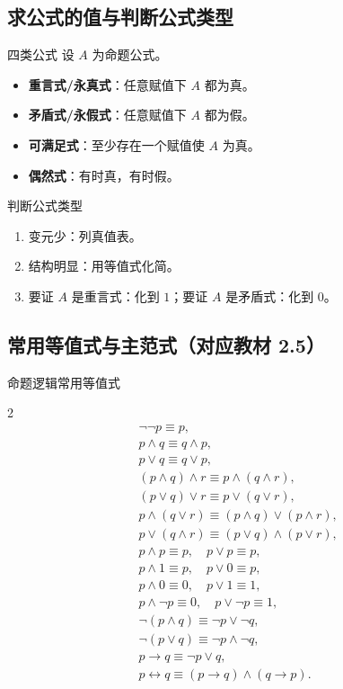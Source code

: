\documentclass[UTF8,zihao=-4]{ctexart}
\newcommand{\kw}[1]{\textbf{\color{main}#1}}
\begin{document}
\subsection{求公式的值与判断公式类型}

\begin{corebox}{四类公式}
设 $A$ 为命题公式。
\begin{itemize}
  \item \kw{重言式/永真式}：任意赋值下 $A$ 都为真。
  \item \kw{矛盾式/永假式}：任意赋值下 $A$ 都为假。
  \item \kw{可满足式}：至少存在一个赋值使 $A$ 为真。
  \item \kw{偶然式}：有时真，有时假。
\end{itemize}
\end{corebox}

\begin{methodbox}{判断公式类型}
\begin{enumerate}
  \item 变元少：列真值表。
  \item 结构明显：用等值式化简。
  \item 要证 $A$ 是重言式：化到 $1$；要证 $A$ 是矛盾式：化到 $0$。
\end{enumerate}
\end{methodbox}

\subsection{常用等值式与主范式（对应教材 2.5）}

\begin{corebox}{命题逻辑常用等值式}
\begin{multicols}{2}
\begin{align*}
&\neg\neg p\equiv p,\\
&p\land q\equiv q\land p,\\
&p\lor q\equiv q\lor p,\\
&(p\land q)\land r\equiv p\land(q\land r),\\
&(p\lor q)\lor r\equiv p\lor(q\lor r),\\
&p\land(q\lor r)\equiv(p\land q)\lor(p\land r),\\
&p\lor(q\land r)\equiv(p\lor q)\land(p\lor r),\\
&p\land p\equiv p,\quad p\lor p\equiv p,\\
&p\land 1\equiv p,\quad p\lor 0\equiv p,\\
&p\land 0\equiv 0,\quad p\lor 1\equiv 1,\\
&p\land\neg p\equiv 0,\quad p\lor\neg p\equiv 1,\\
&\neg(p\land q)\equiv\neg p\lor\neg q,\\
&\neg(p\lor q)\equiv\neg p\land\neg q,\\
&p\to q\equiv\neg p\lor q,\\
&p\leftrightarrow q\equiv(p\to q)\land(q\to p).
\end{align*}
\end{multicols}
\end{corebox}
\end{document}
